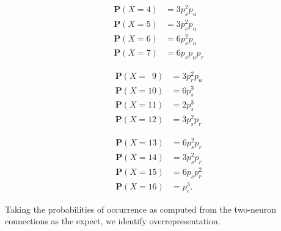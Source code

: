 \vspace{-0.9cm}
\begin{figure}[H]
  \begin{minipage}[c]{0.32\textwidth}
    \begin{align*}
      \mathbf{P}(X=4) &    =   3 p_s^2 p_u\\
      \mathbf{P}(X=5) &    =   3 p_s^2 p_u\\
      \mathbf{P}(X=6) &    =   6 p_s^2 p_u\\
      \mathbf{P}(X=7) &    =   6 p_s p_u p_r
    \end{align*}
  \end{minipage}%
  \begin{minipage}[c]{0.32\textwidth}
    \begin{align*}
      \mathbf{P}(X=\,\,\,9) &    =   3 p_r^2 p_u\\
      \mathbf{P}(X=10) &   =   6 p_s^3   \\
      \mathbf{P}(X=11) &   =   2 p_s^3    \\
      \mathbf{P}(X=12) &   =   3 p_s^2 p_r
    \end{align*}
  \end{minipage}%
  \begin{minipage}[c]{0.32\textwidth}
    \begin{align*}
      \mathbf{P}(X=13) &   =   6 p_s^2 p_r\\
      \mathbf{P}(X=14) &   =   3 p_s^2 p_r\\
      \mathbf{P}(X=15) &   =   6 p_s p_r^2\\
      \mathbf{P}(X=16) &   =   p_r^3.
    \end{align*}
  \end{minipage}
  \vspace{-0.9cm}
\end{figure}

Taking the probabilities of occurrence as computed from the two-neuron
connections as the expect, we identify overrepresentation. 

